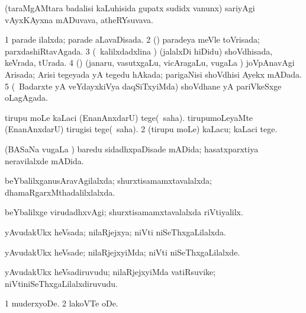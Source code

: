 \bentry
{} 
\gl{\nA}
\expl{}
\bmng
(taraMgAMtara badalisi kaLuhisida gupatx sudidx \mo vanunx) sariyAgi vAyxKAyxna mADuvava, atheRYsuvava. 
\emng
\eentry

\bentry
{} 
\gl{\gu}
\expl{}
\bmng
\bnum
\num{1} parade ilalxda; parade aLavaDisada. 
\num{2} (\caci) paradeya meVle toVrisada; parxdashiRtavAgada. 
\num{3} (\kanmu\ kalilxdadxlina \vi) (jalalxDi hiDidu) shoVdhisada, keVrada, tUrada. 
\num{4} (\rUpa) (janaru, vasutxgaLu, vicAragaLu, \mo vugaLa \vi) joVpAnavAgi Arisada; Arisi tegeyada yA tegedu hAkada; parigaNisi shoVdhisi Ayekx mADada. 
\num{5} (\kanmu\ Badarxte yA veYdayxkiVya daqSiTxyiMda) shoVdhane yA pariVkeSxge oLagAgada. 
\enum
\emng
\eentry

\bentry
{} 
\gl{\sakirx}
\expl{}
\bmng
\bnum
{} 
\banum
{} tirupu moLe kaLaci (EnanAnxdarU) tege(\akirx\ saha). 
 tirupumoLeyaMte (EnanAnxdarU) tirugisi tege(\akirx\ saha). 
\eanum
\numie
\num{2} (tirupu moLe) kaLacu; kaLaci tege. 
\enum
\emng
\eentry

\bentry
{} 
\gl{\gu}
\expl{}
\bmng
(BASaNa \mo vugaLa \vi) baredu sidadhxpaDisade mADida; hasatxparxtiya neravilalxde mADida. 
\emng
\eentry

\bentry
{} 
\gl{\gu}
\expl{}
\bmng
beYbalilxganusAravAgilalxda; shurxtisamamxtavalalxda; dhamaRgarxMthadalilxlalxda. 
\emng
\eentry

\bentry
{} 
\gl{\kirxvi}
\expl{}
\bmng
beYbalilxge virudadhxvAgi; shurxtisamamxtavalalxda riVtiyalilx. 
\emng
\eentry

\bentry
{} 
\gl{\gu}
\expl{}
\bmng
yAvudakUkx heVsada; nilaRjejxya; niVti niSeThxgaLilalxda. 
\emng
\eentry

\bentry
{} 
\gl{\kirxvi}
\expl{}
\bmng
yAvudakUkx heVsade; nilaRjejxyiMda; niVti niSeThxgaLilalxde. 
\emng
\eentry

\bentry
{} 
\gl{\nA}
\expl{}
\bmng
yAvudakUkx heVsadiruvudu; nilaRjejxyiMda vatiRsuvike; niVtiniSeThxgaLilalxdiruvudu. 
\emng
\eentry

\bentry
{} 
\gl{\sakirx}
\expl{}
\bmng
\bnum
\num{1} muderxyoDe. 
\num{2} lakoVTe oDe. 
\enum
\emng
\eentry

